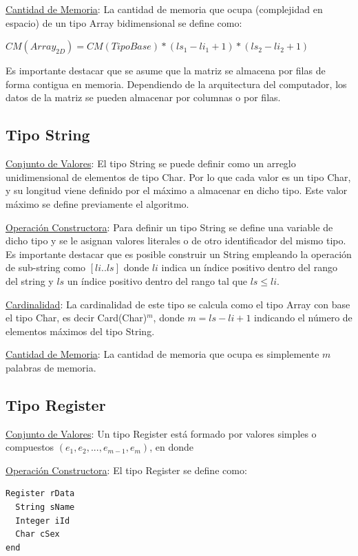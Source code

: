 \underline{Cantidad de Memoria}: La cantidad de memoria que ocupa (complejidad en espacio) de un tipo Array bidimensional se define como:

$CM(Array_{2D}) = CM(TipoBase) * (ls_1 - li_1 + 1) * (ls_2 - li_2 + 1)$

Es importante destacar que se asume que la matriz se almacena por filas de forma contigua en memoria. Dependiendo de la arquitectura del computador, los datos de la matriz se pueden almacenar por columnas o por filas.

\subsection{Tipo String}

\underline{Conjunto de Valores}: El tipo String se puede definir como un arreglo unidimensional de elementos de tipo Char. Por lo que cada valor es un tipo Char, y su longitud viene definido por el máximo a almacenar en dicho tipo. Este valor máximo se define previamente el algoritmo.

\underline{Operación Constructora}: Para definir un tipo String se define una variable de dicho tipo y se le asignan valores literales o de otro identificador del mismo tipo. Es importante destacar que es posible construir un String empleando la operación de sub-string como $[li..ls]$ donde $li$ indica un índice positivo dentro del rango del string y $ls$ un índice positivo dentro del rango tal que $ls \le li$.

\underline{Cardinalidad}: La cardinalidad de este tipo se calcula como el tipo Array con base el tipo Char, es decir Card(Char)$^m$, donde $m = ls - li + 1$ indicando el número de elementos máximos del tipo String.

\underline{Cantidad de Memoria}: La cantidad de memoria que ocupa es simplemente $m$ palabras de memoria.

\subsection{Tipo Register}

\underline{Conjunto de Valores}: Un tipo Register está formado por valores simples o compuestos $(e_{1}, e_{2}, ..., e_{m-1}, e_{m})$, en donde 

\underline{Operación Constructora}: El tipo Register se define como:

\begin{lstlisting}[upquote=true, language=pseudo]
Register rData
  String sName
  Integer iId
  Char cSex
end
\end{lstlisting}

